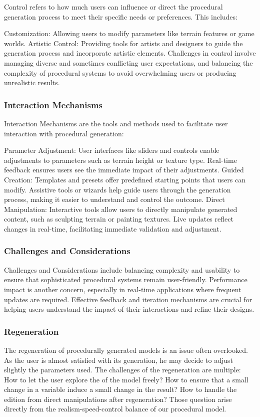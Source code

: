 Control refers to how much users can influence or direct the procedural generation process to meet their specific needs or preferences. This includes:

Customization: Allowing users to modify parameters like terrain features or game worlds.
Artistic Control: Providing tools for artists and designers to guide the generation process and incorporate artistic elements.
Challenges in control involve managing diverse and sometimes conflicting user expectations, and balancing the complexity of procedural systems to avoid overwhelming users or producing unrealistic results.

\subsubsection{Interaction Mechanisms}
Interaction Mechanisms are the tools and methods used to facilitate user interaction with procedural generation:

Parameter Adjustment: User interfaces like sliders and controls enable adjustments to parameters such as terrain height or texture type. Real-time feedback ensures users see the immediate impact of their adjustments.
Guided Creation: Templates and presets offer predefined starting points that users can modify. Assistive tools or wizards help guide users through the generation process, making it easier to understand and control the outcome.
Direct Manipulation: Interactive tools allow users to directly manipulate generated content, such as sculpting terrain or painting textures. Live updates reflect changes in real-time, facilitating immediate validation and adjustment.

\subsubsection{Challenges and Considerations}
Challenges and Considerations include balancing complexity and usability to ensure that sophisticated procedural systems remain user-friendly. Performance impact is another concern, especially in real-time applications where frequent updates are required. Effective feedback and iteration mechanisms are crucial for helping users understand the impact of their interactions and refine their designs.

\subsubsection{Regeneration}
The regeneration of procedurally generated models is an issue often overlooked. As the user is almost satisfied with its generation, he may decide to adjust slightly the parameters used. The challenges of the regeneration are multiple: How to let the user explore the  of the model freely? How to ensure that a small change in a variable induce a small change in the result? How to handle the edition from direct manipulations after regeneration? Those question arise directly from the realism-speed-control balance of our procedural model.

